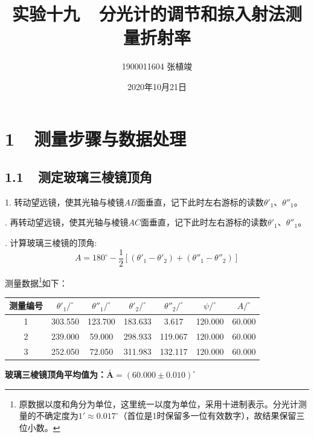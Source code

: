 \documentclass[fontset=windows]{ctexbook}
\begin{document}
\Large

\title{\textbf{实验十九\ \ 分光计的调节和掠入射法测量折射率}}
\author{\Large 1900011604 张植竣}
\date{\Large 2020年10月21日}

\maketitle

\newpage
\section*{ 1\ \ 测量步骤与数据处理}
\bigskip

\subsection*{ 1.1\ \ 测定玻璃三棱镜顶角}

1. 转动望远镜，使其光轴与棱镜$AB$面垂直，记下此时左右游标的读数$\theta'_1$、$\theta''_1$。

. 再转动望远镜，使其光轴与棱镜$AC$面垂直，记下此时左右游标的读数$\theta'_1$、$\theta''_1$。

. 计算玻璃三棱镜的顶角:
\[
    A = 180^{\circ} - \frac{1}{2}[(\theta'_1 - \theta'_2) + (\theta''_1 - \theta''_2)]
\]

测量数据\footnote{原数据以度和角分为单位，这里统一以度为单位，采用十进制表示。分光计测量的不确定度为$1'\approx0.017^{\circ}$（首位是1时保留多一位有效数字），故结果保留三位小数。}如下：

\begin{table}[ht!]\Large
    \begin{center}
            \begin{tabular}{|c|c|c|c|c|c|c|}
                \hline
                测量编号 & $\theta'_1/^{\circ}$ & $\theta''_1/^{\circ}$ & $\theta'_2/^{\circ}$ & $\theta''_2/^{\circ}$ & $\psi/^{\circ}$ & $A/^{\circ}$ \\
                \hline
                1 & 303.550& 123.700 & 183.633 & 3.617   & 120.000  & 60.000\\
                \hline
                2 & 239.000& 59.000  & 298.933 & 119.067 & 120.000  & 60.000\\
                \hline
                3 & 252.050& 72.050  & 311.983 & 132.117 & 120.000  & 60.000\\
                \hline
            \end{tabular}
    \end{center}
\end{table}
\vspace{-0.5em}
\textbf{玻璃三棱镜顶角平均值为：}$\boldsymbol{\bar{A} = (60.000\pm0.010)^{\circ}}$
\end{document}
